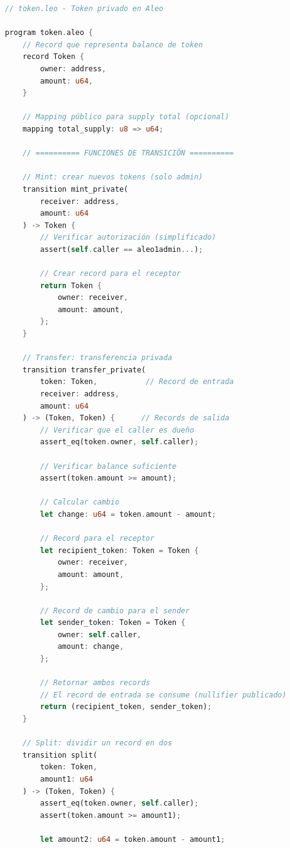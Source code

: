 \documentclass[11pt,a4paper,twoside]{book}
\theoremstyle{definition}
\theoremstyle{remark}
\begin{document}
\begin{lstlisting}[language=Rust, caption={Programa Leo: Token privado}]
// token.leo - Token privado en Aleo

program token.aleo {
    // Record que representa balance de token
    record Token {
        owner: address,
        amount: u64,
    }
    
    // Mapping público para supply total (opcional)
    mapping total_supply: u8 => u64;
    
    // ========== FUNCIONES DE TRANSICIÓN ==========
    
    // Mint: crear nuevos tokens (solo admin)
    transition mint_private(
        receiver: address,
        amount: u64
    ) -> Token {
        // Verificar autorización (simplificado)
        assert(self.caller == aleo1admin...);
        
        // Crear record para el receptor
        return Token {
            owner: receiver,
            amount: amount,
        };
    }
    
    // Transfer: transferencia privada
    transition transfer_private(
        token: Token,           // Record de entrada
        receiver: address,
        amount: u64
    ) -> (Token, Token) {      // Records de salida
        // Verificar que el caller es dueño
        assert_eq(token.owner, self.caller);
        
        // Verificar balance suficiente
        assert(token.amount >= amount);
        
        // Calcular cambio
        let change: u64 = token.amount - amount;
        
        // Record para el receptor
        let recipient_token: Token = Token {
            owner: receiver,
            amount: amount,
        };
        
        // Record de cambio para el sender
        let sender_token: Token = Token {
            owner: self.caller,
            amount: change,
        };
        
        // Retornar ambos records
        // El record de entrada se consume (nullifier publicado)
        return (recipient_token, sender_token);
    }
    
    // Split: dividir un record en dos
    transition split(
        token: Token,
        amount1: u64
    ) -> (Token, Token) {
        assert_eq(token.owner, self.caller);
        assert(token.amount >= amount1);
        
        let amount2: u64 = token.amount - amount1;
        

\end{lstlisting}
\end{document}
